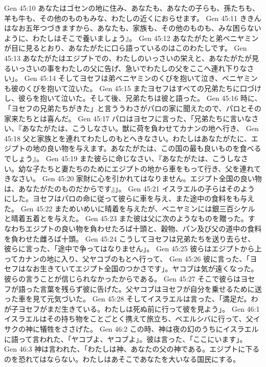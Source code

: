Gen 45:10  あなたはゴセンの地に住み、あなたも、あなたの子らも、孫たちも、羊も牛も、その他のものもみな、わたしの近くにおらせます。
Gen 45:11  ききんはなお五年つづきますから、あなたも、家族も、その他のものも、みな困らないように、わたしはそこで養いましょう』。
Gen 45:12  あなたがたと弟ベニヤミンが目に見るとおり、あなたがたに口ら語っているのはこのわたしです。
Gen 45:13  あなたがたはエジプトでの、わたしのいっさいの栄えと、あなたがたが見るいっさいの事をわたしの父に告げ、急いでわたしの父をここへ連れ下りなさい」。
Gen 45:14  そしてヨセフは弟ベニヤミンのくびを抱いて泣き、ベニヤミンも彼のくびを抱いて泣いた。
Gen 45:15  またヨセフはすべての兄弟たちに口づけし、彼らを抱いて泣いた。そして後、兄弟たちは彼と語った。
Gen 45:16  時に、「ヨセフの兄弟たちがきた」と言ううわさがパロの家に聞えたので、パロとその家来たちとは喜んだ。
Gen 45:17  パロはヨセフに言った、「兄弟たちに言いなさい、『あなたがたは、こうしなさい。獣に荷を負わせてカナンの地へ行き、
Gen 45:18  父と家族とを連れてわたしのもとへきなさい。わたしはあなたがたに、エジプトの地の良い物を与えます。あなたがたは、この国の最も良いものを食べるでしょう』。
Gen 45:19  また彼らに命じなさい、『あなたがたは、こうしなさい。幼な子たちと妻たちのためにエジプトの地から車をもって行き、父を連れてきなさい。
Gen 45:20  家財に心を引かれてはなりません。エジプト全国の良い物は、あなたがたのものだからです』」。
Gen 45:21  イスラエルの子らはそのようにした。ヨセフはパロの命に従って彼らに車を与え、また途中の食料をも与えた。
Gen 45:22  まためいめいに晴着を与えたが、ベニヤミンには銀三百シケルと晴着五着とを与えた。
Gen 45:23  また彼は父に次のようなものを贈った。すなわちエジプトの良い物を負わせたろば十頭と、穀物、パン及び父の道中の食料を負わせた雌ろば十頭。
Gen 45:24  こうしてヨセフは兄弟たちを送り去らせ、彼らに言った、「途中で争ってはなりません」。
Gen 45:25  彼らはエジプトから上ってカナンの地に入り、父ヤコブのもとへ行って、
Gen 45:26  彼に言った、「ヨセフはなお生きていてエジプト全国のつかさです」。ヤコブは気が遠くなった。彼らの言うことが信じられなかったからである。
Gen 45:27  そこで彼らはヨセフが語った言葉を残らず彼に告げた。父ヤコブはヨセフが自分を乗せるために送った車を見て元気づいた。
Gen 45:28  そしてイスラエルは言った、「満足だ。わが子ヨセフがまだ生きている。わたしは死ぬ前に行って彼を見よう」。
Gen 46:1  イスラエルはその持ち物をことごとく携えて旅立ち、ベエルシバに行って、父イサクの神に犠牲をささげた。
Gen 46:2  この時、神は夜の幻のうちにイスラエルに語って言われた、「ヤコブよ、ヤコブよ」。彼は言った、「ここにいます」。
Gen 46:3  神は言われた、「わたしは神、あなたの父の神である。エジプトに下るのを恐れてはならない。わたしはあそこであなたを大いなる国民にする。
